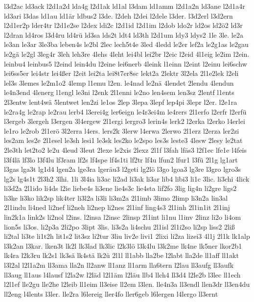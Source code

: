 {l3d2ac
ld3ack
l2d1a2d
lda4g
l2d1ak
ld1al
l3dam
ld1amm
l2d1a2n
ld3ane
l2d1a4r
ld3ari
l3das
ld1au
ld1är
ldbus2
l3de.
l2deh
l2dei
l2dele
l3der.
l3d2erl
l3d2ern
l2d1er2p
lder4tr
l2d1e2se
l2dex
ldi2c
l2d1id
l2d1im
l2dob
ldo2r
ld2os
ld2ö2
ld3r
l2dran
ld4ros
l3d4ru
ld4rü
ld3sa
lds2t
ldt4
ld3th
l2d1um
ldy3
ldys2
1le
3le.
le2a
le3an
le3ar
3le3ba
leben4s
le2bl
2lec
lech5t4e
3led
4ledd
le2er
lef2a
le2g1as
le2gau
le2gä
le2gl
3leg4r
3leh
leh3re
4lehs
4leht
lei4bl
lei2br
l2eic
l2eid
4l1eig
le2im
l2ein.
leinbu4
leinbus5
l2eind
lein4du
l2eine
lei6nerb
4leink
l1einn
l2eint
l2einu
lei6schw
lei6ss5er
lei4str
lei4ßer
l2eit
lei2ta
lei8t7er8sc
lekt2a
2lektr
3l2ela
2l1e2lek
l2eli
lel3s
3lemes
le2m1o2
4lemp
l1emu
l2en.
le4nad
le2nä
4lendet
2lendu
4lendun
le4n3end
4lenerg
l1engl
le3ni
l2enk
2l1enni
le2no
len4sem
len3sz
2lentf
l1ents
2l3entw
lent4wä
5lentwet
len2zi
le1os
2lep
3lepa
3lepf
lep4pi
3lepr
l2er.
l2e1ra
le2ra4g
le2rap
le2rau
lerb4
l3erei4g
ler6eign
le4r3ei4m
le4rers
2l1erfo
l2erfr
l2erfü
l3ergeb
3lergeh
l3ergen
3l4ergew
2l1ergi
lergro3
lerin4s
lerk2
l2erka
l2erko
l4erlei
le1ro
le2rob
2l1erö
3l2erra
l4ers.
lers2k
3lerw
l4erwa
2lerwo
2l1erz
l2erza
ler2zi
les2am
les2e
2l1esel
le3sh
lesi1
le3sk
les2ko
le2spo
les3s
leste3
4lesw
2lesy
le2tat
2le3th
let2to2
le2u
4leud
3leut
2lexe
le2xis
2lexz
2l1f
l3fah
lfäs3
l2f1ec
lfe1e
l4feis
l3f4lä
lf3lo
l3f4lu
lf3ram
lf2s
lf4spe
lf4s1ti
lf2tr
lf4u
lfun2
lfur1
l3fü
2l1g
lg1art
l3gas
lga3t
lg1d4
lgen2a
lge3ra
lgeräu3
l2geti
lg2lö
l3go
lgoa3
lg3re
l3gro
lgro3s
lg2s
lg4s1t
2l3h2
3lhi.
1li
3l4ia
li3ac
li2ad
li3ak
li3ar
lib4
libi3
li1c
3lic.
li3chi
4lick
li3d2a
2l1ido
li4ds
l2ie
liebe4s
li3ene
lie4s3c
lie4sta
lif2fo
3lig
lig4n
li2gre
ligs2
li3ke
li3ko
lik2sp
lik4ter
li3l2a
li3li
li3m2a
2l1imb
3limo
2limp
li3n2a
lin3al
2l1indu
li4ned
li2nef
li2neh
li2nep
li2nes
2l1inf
ling4s3
2l1inh
2l1in1it
2l1inj
lin2k1a
link2s
li2nol
l2ins.
l2insa
l2insc
2linsp
2l1int
li1nu
l1inv
2linz
li2o
li4om
lion5s
li3os.
li2p3a
2li2po
3lipt
3lis.
li3s2a
li4schu
2l1isl
2l1i2so
li2sp
liss2
2liß
li2tal
li3te
li1t2h
lit1s2
lit3sz
li2tur
3liu
liv2e
livi1
2lixi
li2za
lizei3
4l1j
2l1k
lk1alp
l3k2an
l3kar.
lken3t
lk2l
lk3lad
lk3lic
l2k3lö
l3k4lu
l3k2me
lk4ne
lk5ner
lkor2b1
lk4ra
l2k3ru
lk2s1
lk3sä
lk4stä
lk2ü
2l1l
ll1abb
lla2be
l2labt
lla2de
ll1aff
ll1akt
l3l2al
l2l1a2m
ll3ama
lla2n
ll2anw
ll1anz
ll1arm
lla6tern
l2lau
ll3aufg
ll3aufk
ll3aug
ll1aus
l4lausf
l2la2w
l2läd
l2l1äm
l2läu
llb4
llch4
ll3d4
l2le2b
l3lec
ll1ech
l2l1ef
lle2gu
lle2he
l2leib
ll1eim
ll3eise
ll2em
l3len.
lle4n3a
ll3endl
llen3dr
ll3en4du
ll2eng
l4lents
l3ler.
lle2ra
l6lereig
ller4fo
ller6geb
l6lergen
l4lergo
ll3ernt
}
